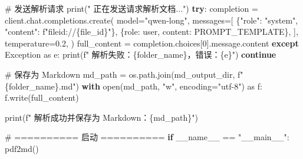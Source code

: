 \documentclass[
  letterpaper,
  DIV=11,
  numbers=noendperiod]{scrreprt}
\newenvironment{Shaded}{\begin{snugshade}}{\end{snugshade}}
\newcommand{\BuiltInTok}[1]{\textcolor[rgb]{0.00,0.23,0.31}{#1}}
\newcommand{\CommentTok}[1]{\textcolor[rgb]{0.37,0.37,0.37}{#1}}
\newcommand{\ControlFlowTok}[1]{\textcolor[rgb]{0.00,0.23,0.31}{\textbf{#1}}}
\newcommand{\DecValTok}[1]{\textcolor[rgb]{0.68,0.00,0.00}{#1}}
\newcommand{\FloatTok}[1]{\textcolor[rgb]{0.68,0.00,0.00}{#1}}
\newcommand{\ImportTok}[1]{\textcolor[rgb]{0.00,0.46,0.62}{#1}}
\newcommand{\NormalTok}[1]{\textcolor[rgb]{0.00,0.23,0.31}{#1}}
\newcommand{\OperatorTok}[1]{\textcolor[rgb]{0.37,0.37,0.37}{#1}}
\newcommand{\PreprocessorTok}[1]{\textcolor[rgb]{0.68,0.00,0.00}{#1}}
\newcommand{\SpecialCharTok}[1]{\textcolor[rgb]{0.37,0.37,0.37}{#1}}
\newcommand{\SpecialStringTok}[1]{\textcolor[rgb]{0.13,0.47,0.30}{#1}}
\newcommand{\StringTok}[1]{\textcolor[rgb]{0.13,0.47,0.30}{#1}}
\newcommand{\VariableTok}[1]{\textcolor[rgb]{0.07,0.07,0.07}{#1}}
\begin{document}
\begin{Shaded}
\begin{Highlighting}[]
            \CommentTok{\# 发送解析请求}
            \BuiltInTok{print}\NormalTok{(}\StringTok{" 正在发送请求解析文档..."}\NormalTok{)}
            \ControlFlowTok{try}\NormalTok{:}
\NormalTok{                completion }\OperatorTok{=}\NormalTok{ client.chat.completions.create(}
\NormalTok{                    model}\OperatorTok{=}\StringTok{"qwen{-}long"}\NormalTok{,}
\NormalTok{                    messages}\OperatorTok{=}\NormalTok{[}
\NormalTok{                        \{}\StringTok{"role"}\NormalTok{: }\StringTok{"system"}\NormalTok{, }\StringTok{"content"}\NormalTok{: }\SpecialStringTok{f"fileid://}\SpecialCharTok{\{}\NormalTok{file\_id}\SpecialCharTok{\}}\SpecialStringTok{"}\NormalTok{\},}
\NormalTok{                        \{}\StringTok{\textquotesingle{}role\textquotesingle{}}\NormalTok{: }\StringTok{\textquotesingle{}user\textquotesingle{}}\NormalTok{, }\StringTok{\textquotesingle{}content\textquotesingle{}}\NormalTok{: PROMPT\_TEMPLATE\},}
\NormalTok{                    ],}
\NormalTok{                    temperature}\OperatorTok{=}\FloatTok{0.2}\NormalTok{,}
\NormalTok{                )}
\NormalTok{                full\_content }\OperatorTok{=}\NormalTok{ completion.choices[}\DecValTok{0}\NormalTok{].message.content}
            \ControlFlowTok{except} \PreprocessorTok{Exception} \ImportTok{as}\NormalTok{ e:}
                \BuiltInTok{print}\NormalTok{(}\SpecialStringTok{f" 解析失败：}\SpecialCharTok{\{}\NormalTok{folder\_name}\SpecialCharTok{\}}\SpecialStringTok{，错误：}\SpecialCharTok{\{}\NormalTok{e}\SpecialCharTok{\}}\SpecialStringTok{"}\NormalTok{)}
                \ControlFlowTok{continue}

            \CommentTok{\# 保存为 Markdown}
\NormalTok{            md\_path }\OperatorTok{=}\NormalTok{ os.path.join(md\_output\_dir, }\SpecialStringTok{f"}\SpecialCharTok{\{}\NormalTok{folder\_name}\SpecialCharTok{\}}\SpecialStringTok{.md"}\NormalTok{)}
            \ControlFlowTok{with} \BuiltInTok{open}\NormalTok{(md\_path, }\StringTok{"w"}\NormalTok{, encoding}\OperatorTok{=}\StringTok{"utf{-}8"}\NormalTok{) }\ImportTok{as}\NormalTok{ f:}
\NormalTok{                f.write(full\_content)}

            \BuiltInTok{print}\NormalTok{(}\SpecialStringTok{f" 解析成功并保存为 Markdown：}\SpecialCharTok{\{}\NormalTok{md\_path}\SpecialCharTok{\}}\SpecialStringTok{"}\NormalTok{)}

\CommentTok{\# ========== 启动 ==========}
\ControlFlowTok{if} \VariableTok{\_\_name\_\_} \OperatorTok{==} \StringTok{"\_\_main\_\_"}\NormalTok{:}
\NormalTok{    pdf2md()}
\end{Highlighting}
\end{Shaded}
\end{document}
